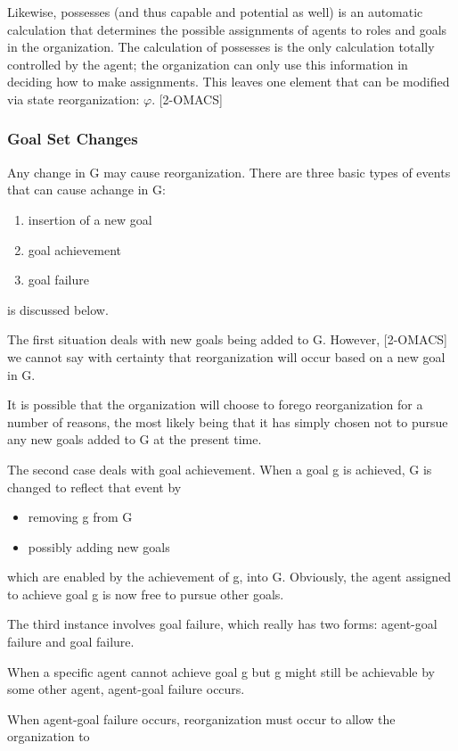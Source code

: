 Likewise, possesses (and thus capable and potential as well) is an automatic calculation that determines the possible assignments of agents to roles and goals in the organization. The calculation of possesses is the only calculation totally controlled by the agent; the organization can only use this information in deciding how to make assignments. This leaves one element that can be modified via state reorganization: $\varphi$.
	[2-OMACS]
\subsubsection{ Goal Set Changes }
Any change in G may cause reorganization. There are three basic types 
of events that can cause achange in G: 
\begin{enumerate}
\item   insertion of a new goal  
\item   goal achievement 
\item   goal failure
\end{enumerate}

is discussed below. 

The first situation deals with new goals being added to G. However, [2-OMACS]
we cannot say with certainty that reorganization will occur based on a new goal in G. 

It is possible that the organization will choose to forego reorganization for a number of reasons, the most likely being that it has simply chosen not to pursue any new goals added to G at the present time.

The second case deals with goal achievement. When a goal g is achieved, G is changed to reflect that event by 

\begin{itemize}
\item  removing g from G
\item  possibly adding new goals
\end{itemize}	

 which are enabled by the achievement of g, into G. Obviously, the agent assigned to achieve goal g is now free to pursue other goals. 

The third instance involves goal failure, which really has two forms: agent-goal failure and goal failure.

When a specific agent cannot achieve goal g but g might still be achievable by some other agent, 
agent-goal failure occurs. 

When agent-goal failure occurs, reorganization must occur to allow the organization to 

